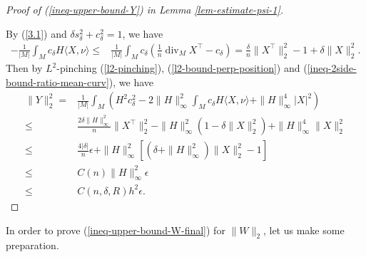 \documentclass{amsart}
\numberwithin{equation}{section}
\theoremstyle{remark}
\renewcommand{\(}{\left(}
\renewcommand{\)}{\right)}
\renewcommand{\~}{\tilde}
\renewcommand{\-}{\overline}
\renewcommand{\d}{\delta}
\newcommand{\e}{\epsilon}
\newcommand{\divv}{\operatorname{div }}
\begin{document}
\vspace{2mm}
\begin{proof}[Proof of (\ref{ineq-upper-bound-Y}) in Lemma \ref{lem-estimate-psi-1}]
	~
	
	By (\ref{3.1}) and $\d s_\d^2+c_\d^2=1$, we have
	\begin{equation}\label{ineq-inner-product}
	\begin{split}
	-\frac{1}{|M|}\int_M c_\d H \langle X,\nu\rangle\leq &\frac{1}{|M|}\int_M c_\d \(\frac{1}{n}\divv_M X^\top-c_\d\)=\frac{\d}{n}\|X^\top\|_2^2-1+\d\|X\|_2^2.
	\end{split}
	\end{equation}
	Then by $L^2$-pinching (\ref{l2-pinching}), (\ref{l2-bound-perp-position}) and (\ref{ineq-2side-bound-ratio-mean-curv}), we have
	\begin{align*}
	\|Y\|_2^2=&\frac{1}{|M|}\int_M  \(H^2 c_\d^2-2\|H\|_\infty^2 \int_M c_\d H \langle X,\nu\rangle+\|H\|_\infty^4 |X|^2 \) \\
	\leq & \frac{2\d\|H\|_\infty^2}{n}\|X^\top\|_2^2-\|H\|_\infty^2(1-\d\|X\|_2^2)+\|H\|_\infty^4 \|X\|_2^2 \\
	\leq & \frac{4|\d|}{n}\e+\|H\|_\infty^2\left[ (\d+\|H\|_\infty^2)\|X\|_2^2-1\right] \\
	\leq & C(n)\|H\|_\infty^2\e \\
	\leq &C(n,\d,R)h^2\e.
	\end{align*}
\end{proof}


In order to prove (\ref{ineq-upper-bound-W-final}) for $\|W\|_2$, let us make some preparation.
\end{document}
